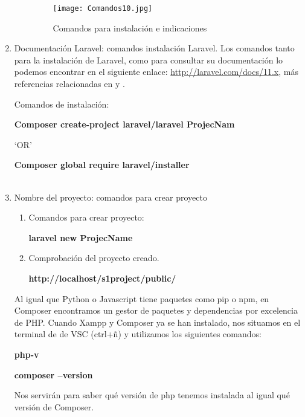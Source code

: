 \documentclass{article}
\begin{document}
\begin{enumerate}
\begin{enumerate}
\begin{figure}[!]
\centering
\texttt{[image: Comandos10.jpg]}
\caption{\label{fig:10} Comandos para instalación e indicaciones }
\end{figure}

        \end{enumerate}


\item Documentación Laravel: comandos instalación Laravel.
Los comandos tanto para la instalación de Laravel, como para consultar su documentación lo podemos encontrar en el siguiente enlace: \url{http://laravel.com/docs/11.x}, más referencias relacionadas en \cite{docLaravel} y
\cite{docLaravelviews}.

Comandos de instalación: 


\textbf{Composer create-project laravel/laravel  ProjecNam} 

‘OR’ 

\textbf{Composer global require laravel/installer}\\
\\

\item  Nombre del proyecto: comandos para crear proyecto
\begin{enumerate}
    \item  Comandos para crear proyecto:
    
            \textbf{laravel new ProjecName}
    \item  Comprobación del proyecto creado. 

        \textbf{http://localhost/s1project/public/}
\end{enumerate}

Al igual que Python o Javascript tiene paquetes como pip o npm, en Composer encontramos un gestor de paquetes y dependencias por excelencia de PHP.
Cuando Xampp y Composer ya se han instalado, nos situamos en el terminal de de VSC (ctrl+ñ) y utilizamos los siguientes comandos: 

\textbf{php-v}

\textbf{composer –version}

Nos servirán para saber qué versión de php tenemos instalada al igual qué versión de Composer.




\end{enumerate}
\end{document}
